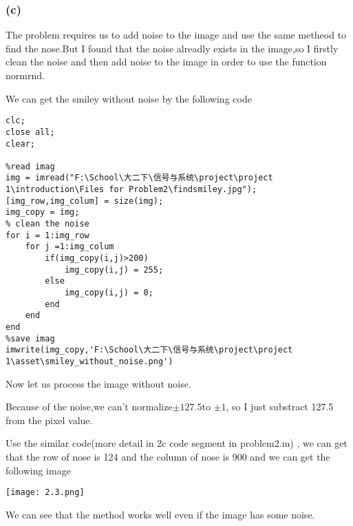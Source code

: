 \documentclass{article}
\begin{document}
\subsubsection*{(c)}
The problem requires us to add noise to the image and 
use the same metheod to find the nose.But I found that 
the noise alreadly exists in the image,so I firstly clean 
the noise and then add noise to the image in order to 
use the function normrnd.\par
We can get the smiley without noise by the following code
\begin{lstlisting}
clc;
close all;
clear;

%read imag
img = imread("F:\School\大二下\信号与系统\project\project 1\introduction\Files for Problem2\findsmiley.jpg");
[img_row,img_colum] = size(img);
img_copy = img;
% clean the noise
for i = 1:img_row
    for j =1:img_colum
        if(img_copy(i,j)>200)
            img_copy(i,j) = 255;
        else
            img_copy(i,j) = 0;
        end
    end
end
%save imag
imwrite(img_copy,'F:\School\大二下\信号与系统\project\project 1\asset\smiley_without_noise.png')
\end{lstlisting}
Now let us process the image without noise.\par
Because of the noise,we can't normalize$\pm 127.5$to $\pm 1$,
so I just substract 127.5 from the pixel value.\par
Use the similar code(more detail in 2c code segment in problem2.m) ,
we can get that the row of nose is 124 and
the column of nose is 900 and we can get the following image
\begin{center}
    \texttt{[image: 2.3.png]}
\end{center}
We can see that the method works well even if the image has some noise.
\end{document}
